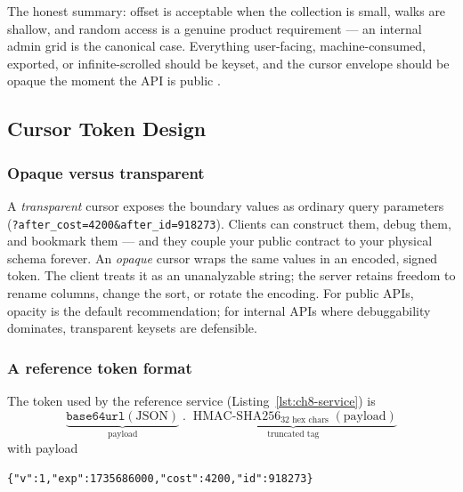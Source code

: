 The honest summary: offset is acceptable when the collection is small,
walks are shallow, and random access is a genuine product requirement ---
an internal admin grid is the canonical case. Everything user-facing,
machine-consumed, exported, or infinite-scrolled should be keyset, and the
cursor envelope should be opaque the moment the API is public
\cite{gehl2021apidesign}.

\subsection{Cursor Token Design}
\label{subsec:ch8-cursor-design}

\subsubsection{Opaque versus transparent}

A \emph{transparent} cursor exposes the boundary values as ordinary query
parameters (\texttt{?after\_cost=4200\&after\_id=918273}). Clients can
construct them, debug them, and bookmark them --- and they couple your public
contract to your physical schema forever. An \emph{opaque} cursor wraps the
same values in an encoded, signed token. The client treats it as an
unanalyzable string; the server retains freedom to rename columns, change
the sort, or rotate the encoding. For public APIs, opacity is the default
recommendation; for internal APIs where debuggability dominates, transparent
keysets are defensible.

\subsubsection{A reference token format}

The token used by the reference service (Listing~\ref{lst:ch8-service}) is
\[
\underbrace{\texttt{base64url}(\mathrm{JSON})}_{\text{payload}}
\;\texttt{.}\;
\underbrace{\operatorname{HMAC\text{-}SHA256}_{\text{32 hex chars}}(\text{payload})}_{\text{truncated tag}}
\]
with payload
\begin{verbatim}
{"v":1,"exp":1735686000,"cost":4200,"id":918273}
\end{verbatim}

